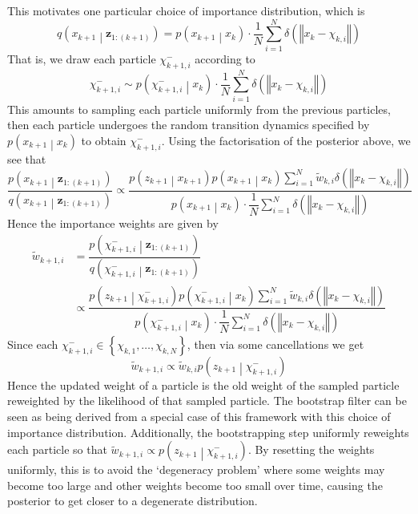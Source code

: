 \documentclass[11pt]{report} %
\begin{document}
This motivates one particular choice of importance distribution, which is
\begin{equation}
\ensuremath{q\left(x_{k+1}\middle|\mathbf{z}_{1:\left(k+1\right)}\right)=p\left(x_{k+1}\middle|x_{k}\right)\cdot\dfrac{1}{N}\sum_{i=1}^{N}\delta\left(\left\Vert x_{k}-\chi_{k,i}\right\Vert \right)}
\end{equation}
That is, we draw each particle $\chi_{k + 1, i}^{-}$ according to
\begin{equation}
\chi_{k + 1, i}^{-} \sim p\left(\chi_{k + 1, i}^{-}\middle|x_{k}\right)\cdot\dfrac{1}{N}\sum_{i=1}^{N}\delta\left(\left\Vert x_{k} -\chi_{k,i}\right\Vert \right)
\end{equation}
This amounts to sampling each particle uniformly from the previous particles, then each particle undergoes the random transition dynamics specified by $p\left(x_{k+1}\middle|x_{k}\right)$ to obtain $\chi_{k+1,i}^{-}$. Using the factorisation of the posterior above, we see that
\begin{equation}
\dfrac{p\left(x_{k+1}\middle|\mathbf{z}_{1:\left(k+1\right)}\right)}{q\left(x_{k+1}\middle|\mathbf{z}_{1:\left(k+1\right)}\right)} \propto \dfrac{p\left(z_{k+1}\middle|x_{k+1}\right)p\left(x_{k+1}\middle|x_{k}\right)\sum_{i=1}^{N}\widetilde{w}_{k,i}\delta\left(\left\Vert x_{k}-\chi_{k,i}\right\Vert \right)}{p\left(x_{k+1}\middle|x_{k}\right)\cdot\dfrac{1}{N}\sum_{i=1}^{N}\delta\left(\left\Vert x_{k}-\chi_{k,i}\right\Vert \right)}
\end{equation}
Hence the importance weights are given by
\begin{align}
\widetilde{w}_{k + 1, i} &= \dfrac{p\left(\chi_{k + 1, i}^{-}\middle|\mathbf{z}_{1:\left(k + 1\right)}\right)}{q\left(\chi_{k + 1, i}^{-}\middle|\mathbf{z}_{1:\left(k + 1\right)}\right)} \\
&\propto \dfrac{p\left(z_{k+1}\middle|\chi_{k+1,i}^{-}\right)p\left(\chi_{k+1,i}^{-}\middle|x_{k}\right)\sum_{i=1}^{N}\widetilde{w}_{k,i}\delta\left(\left\Vert x_{k}-\chi_{k,i}\right\Vert \right)}{p\left(\chi_{k+1,i}^{-}\middle|x_{k}\right)\cdot\dfrac{1}{N}\sum_{i=1}^{N}\delta\left(\left\Vert x_{k}-\chi_{k,i}\right\Vert \right)}
\end{align}
Since each $\chi_{k + 1, i}^{-} \in \left\{\chi_{k, 1}, \dots, \chi_{k, N}\right\}$, then via some cancellations we get
\begin{equation}
\widetilde{w}_{k+1,i}\propto\widetilde{w}_{k,i}p\left(z_{k+1}\middle|\chi_{k+1,i}^{-}\right)
\end{equation}
Hence the updated weight of a particle is the old weight of the sampled particle reweighted by the likelihood of that sampled particle. The bootstrap filter can be seen as being derived from a special case of this framework with this choice of importance distribution. Additionally, the bootstrapping step uniformly reweights each particle so that $\widetilde{w}_{k+1,i}\propto p\left(z_{k+1}\middle|\chi_{k+1,i}^{-}\right)$. By resetting the weights uniformly, this is to avoid the `degeneracy problem' \cite{Ristic2004} where some weights may become too large and other weights become too small over time, causing the posterior to get closer to a degenerate distribution. \\
\end{document}

